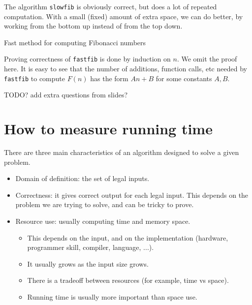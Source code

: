 The algorithm \texttt{slowfib} %
is obviously correct, but does a lot of repeated computation. 
With a small (fixed) amount of extra space, we can do better, by 
working from the bottom up instead of from the top down.

\begin{algorithm}[H]
  \caption{Fast method for computing Fibonacci numbers
    \label{alg:fastfib}}
\begin{algorithmic}[1]
\Else
{} 
  
\EndFor
\EndIf
\State {}
\EndFunction
\end{algorithmic}
\end{algorithm}
 
Proving correctness of \texttt{fastfib} is done by induction on $n$.  We omit the proof here.
It is easy to see that the number of additions, function calls, etc needed by 
\texttt{fastfib} to compute $F(n)$ has the form $An+B$ for some constants $A, B$.

TODO? add extra questions from slides?



\chapter{How to measure running time} %

There are three main characteristics of an algorithm designed to solve a given 
problem.
\begin{itemize}
\item Domain of definition: the set of legal inputs. 
\item Correctness: it gives correct output for each legal input. 
This depends on the problem we are trying to solve, and can be tricky to prove. 
\item Resource use: usually computing time and memory space. 
\begin{itemize} 
\item This depends on the input, and on the implementation 
(hardware, programmer skill, compiler, language, ...). 
\item It usually grows as the input size grows. 
\item There is a tradeoff between resources (for example, time vs space). 
\item Running time is usually more important than space use. 
\end{itemize}
\end{itemize}

